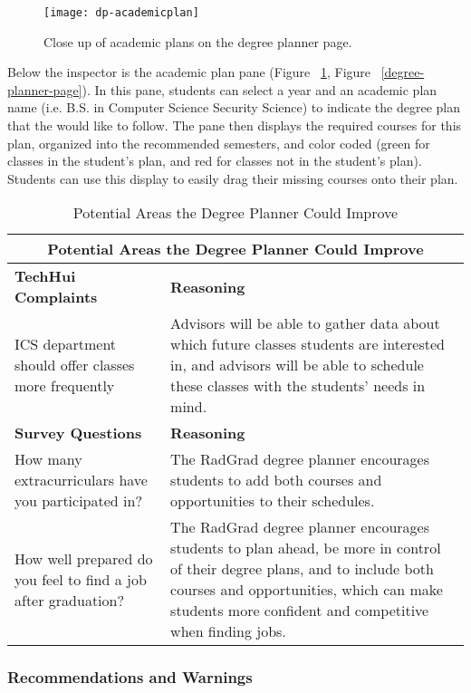 \begin{figure}[htbp!]
\centering
\texttt{[image: dp-academicplan]}
\caption{Close up of academic plans on the degree planner page.}
\label{academic-plans}
\end{figure}
Below the inspector is the academic plan pane (Figure ~\ref{academic-plans}, Figure ~\ref{degree-planner-page}). In this pane, students can select a year and an academic plan name (i.e. B.S. in Computer Science Security Science) to indicate the degree plan that the would like to follow. The pane then displays the required courses for this plan, organized into the recommended semesters, and color coded (green for classes in the student's plan, and red for classes not in the student's plan). Students can use this display to easily drag their missing courses onto their plan.

\begin{table}[htbp!]
\centering
\begin{tabular}{  |p{4cm}|p{12cm}| } 
\hline
 \multicolumn{2}{|c|}{Potential Areas the Degree Planner Could Improve}\\
  \hline
 \textbf{TechHui Complaints} & \textbf{Reasoning} \\ 
  \hline
ICS department should offer classes more frequently & Advisors will be able to gather data about which future classes students are interested in, and advisors will be able to schedule these classes with the students' needs in mind. \\
\hline
 \textbf{Survey Questions} & \textbf{Reasoning} \\ 
  \hline
  How many extracurriculars have you participated in? & The RadGrad degree planner encourages students to add both courses and opportunities to their schedules.\\
  \hline
  How well prepared do you feel to find a job after graduation? & The RadGrad degree planner encourages students to plan ahead, be more in control of their degree plans, and to include both courses and opportunities, which can make students more confident and competitive when finding jobs.\\
  \hline
\end{tabular} 
\caption{Potential Areas the Degree Planner Could Improve}
\end{table}

\subsubsection{Recommendations and Warnings}

